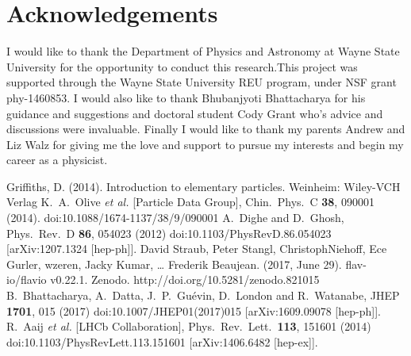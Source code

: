 \documentclass[12pt]{article}
\begin{document}
\section{Acknowledgements}
I would like to thank the Department of Physics and Astronomy at Wayne State University for the opportunity to conduct this research.This project was supported through the Wayne State University REU program, under NSF grant phy-1460853. I would also like to thank Bhubanjyoti Bhattacharya for his guidance and suggestions and doctoral student Cody Grant who's advice and discussions were invaluable. Finally I would like to thank my parents Andrew and Liz Walz for giving me the love and support to pursue my interests and begin my career as a physicist.  
\newpage
\begin{thebibliography}{9}
Griffiths, D. (2014). Introduction to elementary particles. Weinheim: Wiley-VCH Verlag
  K.~A.~Olive {\it et al.} [Particle Data Group],
  Chin.\ Phys.\ C {\bf 38}, 090001 (2014).
  doi:10.1088/1674-1137/38/9/090001
  A.~Dighe and D.~Ghosh,
  Phys.\ Rev.\ D {\bf 86}, 054023 (2012)
  doi:10.1103/PhysRevD.86.054023
  [arXiv:1207.1324 [hep-ph]].
    David Straub, Peter Stangl, ChristophNiehoff, Ece Gurler, wzeren, Jacky Kumar, … Frederik Beaujean. (2017, June 29). flav-io/flavio v0.22.1. Zenodo. http://doi.org/10.5281/zenodo.821015
  B.~Bhattacharya, A.~Datta, J.~P.~Guévin, D.~London and R.~Watanabe,
  JHEP {\bf 1701}, 015 (2017)
  doi:10.1007/JHEP01(2017)015
  [arXiv:1609.09078 [hep-ph]].
  R.~Aaij {\it et al.} [LHCb Collaboration],
  Phys.\ Rev.\ Lett.\  {\bf 113}, 151601 (2014)
  doi:10.1103/PhysRevLett.113.151601
  [arXiv:1406.6482 [hep-ex]].

\end{thebibliography}
\end{document}
